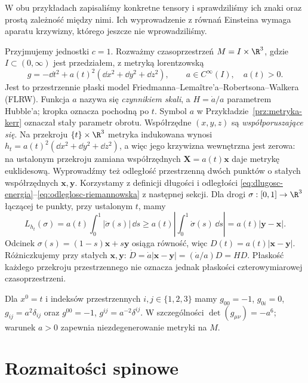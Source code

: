 W obu przykładach zapisaliśmy konkretne tensory
i sprawdziliśmy ich znaki oraz prostą zależność
między nimi. Ich wyprowadzenie z równań Einsteina
wymaga aparatu krzywizny, którego jeszcze nie
wprowadziliśmy.

\begin{przyklad}
\label{prz:flrw-metryka}
Przyjmujemy jednostki $c=1$. Rozważmy czasoprzestrzeń
$M=I\times\R^3$, gdzie $I\subset(0,\infty)$ jest przedziałem,
z metryką lorentzowską
\begin{equation}\label{eq:flrw-metryka}
 g=-\dd t^2+a(t)^2(\dd x^2+\dd y^2+\dd z^2),
 \qquad a\in C^\infty(I),\quad a(t)>0.
\end{equation}
Jest to przestrzennie płaski model Friedmanna--Lemaître'a--Robertsona--Walkera
(FLRW). Funkcja $a$ nazywa się \emph{czynnikiem skali}, a
$H=\dot a/a$ parametrem Hubble'a; kropka oznacza pochodną po $t$.
Symbol $a$ w Przykładzie~\ref{prz:metryka-kerr} oznaczał
stały parametr obrotu. Współrzędne $(x,y,z)$ są
\emph{współporuszające się}.
Na przekroju $\{t\}\times\R^3$ metryka indukowana wynosi
$h_t=a(t)^2(\dd x^2+\dd y^2+\dd z^2)$, a więc jego
krzywizna wewnętrzna jest zerowa: na ustalonym przekroju
zamiana współrzędnych $\mathbf X=a(t)\mathbf x$ daje metrykę
euklidesową. Wyprowadźmy też odległość przestrzenną dwóch
punktów o stałych współrzędnych $\mathbf x,\mathbf y$.
Korzystamy z definicji długości i odległości
\eqref{eq:dlugosc-energia}--\eqref{eq:odleglosc-riemannowska}
z następnej sekcji. Dla drogi $\sigma:[0,1]\to\R^3$
łączącej te punkty, przy ustalonym $t$, mamy
\[
 L_{h_t}(\sigma)
 =a(t)\int_0^1|\dot\sigma(s)|\,\dd s
 \geq a(t)\left|\int_0^1\dot\sigma(s)\,\dd s\right|
 =a(t)|\mathbf y-\mathbf x|.
\]
Odcinek $\sigma(s)=(1-s)\mathbf x+s\mathbf y$ osiąga
równość, więc $D(t)=a(t)|\mathbf x-\mathbf y|$.
Różniczkujemy przy stałych $\mathbf x,\mathbf y$:
$\dot D=\dot a|\mathbf x-\mathbf y|=(\dot a/a)D=HD$.
Płaskość każdego przekroju przestrzennego nie oznacza jednak
płaskości czterowymiarowej czasoprzestrzeni.

Dla $x^0=t$ i indeksów przestrzennych $i,j\in\{1,2,3\}$
mamy $g_{00}=-1$, $g_{0i}=0$, $g_{ij}=a^2\delta_{ij}$
oraz $g^{00}=-1$, $g^{ij}=a^{-2}\delta^{ij}$.
W szczególności $\det(g_{\mu\nu})=-a^6$; warunek $a>0$
zapewnia niezdegenerowanie metryki na $M$.
\end{przyklad}

\section{Rozmaitości spinowe}
\label{sec:rozmaitosci-spinowe}

